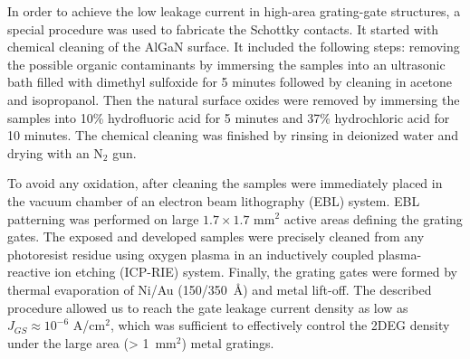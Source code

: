\documentclass[%
 reprint,
 amsmath,amssymb,
 aps,
]{revtex4-2}
\begin{document}
In order to achieve the low leakage current in high-area grating-gate structures, a special procedure was used to fabricate the Schottky contacts. It started with chemical cleaning of the AlGaN surface. It included the following steps: removing the possible organic contaminants by immersing the samples into an ultrasonic bath filled with dimethyl sulfoxide for 5 minutes followed by cleaning in acetone and isopropanol. Then the natural surface oxides were removed by immersing the samples into 10\% hydrofluoric acid for 5 minutes and 37\% hydrochloric acid for 10 minutes. The chemical cleaning was finished by rinsing in deionized water and drying with an N$_2$ gun.

To avoid any oxidation, after cleaning the samples were immediately placed in the vacuum chamber of an electron beam lithography (EBL) system.  EBL patterning was performed on large $1.7 \times 1.7$ mm$^2$ active areas defining the grating gates. The exposed and developed samples were precisely cleaned from any photoresist residue using oxygen plasma in an inductively coupled plasma-reactive ion etching (ICP-RIE) system. Finally, the grating gates were formed by thermal evaporation of Ni/Au (150/350~\AA) and metal lift-off. The described procedure allowed us to reach the gate leakage current density as low as $J_{GS} \approx 10^{-6}$ A/cm$^2$, which was sufficient to effectively control the 2DEG density under the large area (> 1~mm$^2$) metal gratings.
\end{document}
